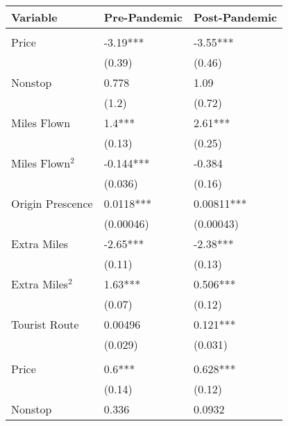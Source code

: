 
\begin{tabular}[t]{lll}
\toprule
Variable & Pre-Pandemic & Post-Pandemic\\
\midrule
\addlinespace[0.3em]
\multicolumn{3}{l}{\textbf{Linear Coefficients}}\\
\hspace{1em}Price & -3.19*** & -3.55***\\
\hspace{1em} & (0.39) & (0.46)\\
\hspace{1em}Nonstop & 0.778 & 1.09\\
\hspace{1em} & (1.2) & (0.72)\\
\hspace{1em}Miles Flown & 1.4*** & 2.61***\\
\hspace{1em} & (0.13) & (0.25)\\
\hspace{1em}Miles Flown$^2$ & -0.144*** & -0.384\\
\hspace{1em} & (0.036) & (0.16)\\
\hspace{1em}Origin Prescence & 0.0118*** & 0.00811***\\
\hspace{1em} & (0.00046) & (0.00043)\\
\hspace{1em}Extra Miles & -2.65*** & -2.38***\\
\hspace{1em} & (0.11) & (0.13)\\
\hspace{1em}Extra Miles$^2$ & 1.63*** & 0.506***\\
\hspace{1em} & (0.07) & (0.12)\\
\hspace{1em}Tourist Route & 0.00496 & 0.121***\\
\hspace{1em} & (0.029) & (0.031)\\
\midrule
\addlinespace[0.3em]
\multicolumn{3}{l}{\textbf{Nonlinear Coefficients}}\\
\hspace{1em}Price & 0.6*** & 0.628***\\
\hspace{1em} & (0.14) & (0.12)\\
\hspace{1em}Nonstop & 0.336 & 0.0932\\

\end{tabular}
